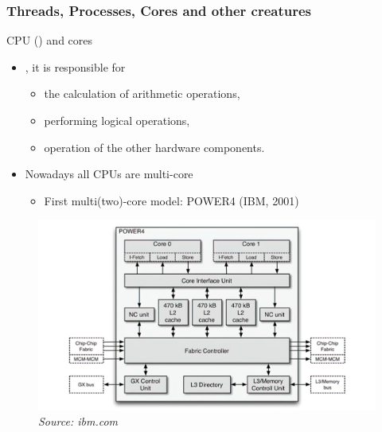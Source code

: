 \begin{frame}
\frametitle{Threads, Processes, Cores and other creatures}

 {
\begin{block}{CPU () and cores}
	\begin{itemize}
		\item {}, it is responsible for
		\begin{itemize}
			\item the calculation of arithmetic operations,
			\item performing logical operations,
			\item operation of the other hardware components.
		\end{itemize}
		\item Nowadays all CPUs are multi-core
		\begin{itemize}
			\item First multi(two)-core model: POWER4 (IBM, 2001)
		\end{itemize}
	\end{itemize}
\end{block}
}

 {
\begin{figure}
	\includegraphics[width=\textwidth]{img/power4-2x.png}
	{\hspace*{\fill}\tiny\textit{Source: ibm.com}}	
\end{figure}
}


\end{frame}
